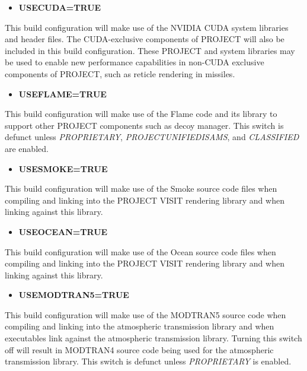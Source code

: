 \documentclass[12pt,letterpaper]{article}
\begin{document}
\begin{itemize}
\item \textbf{USECUDA=TRUE}
\end{itemize}

This build configuration will make use of the NVIDIA CUDA system libraries and header files.  The CUDA-exclusive components of PROJECT will also be included in this build configuration.  These PROJECT and system libraries may be used to enable new performance capabilities in non-CUDA exclusive components of PROJECT, such as reticle rendering in missiles.

\begin{itemize}
\item \textbf{USEFLAME=TRUE}
\end{itemize}

This build configuration will make use of the Flame code and its library to support other PROJECT components such as decoy manager.  This switch is defunct unless \emph{PROPRIETARY}, \emph{PROJECTUNIFIEDISAMS}, and \emph{CLASSIFIED} are enabled.

\begin{itemize}
\item \textbf{USESMOKE=TRUE}
\end{itemize}

This build configuration will make use of the Smoke source code files when compiling and linking into the PROJECT VISIT rendering library and when linking against this library.

\begin{itemize}
\item \textbf{USEOCEAN=TRUE}
\end{itemize}

This build configuration will make use of the Ocean source code files when compiling and linking into the PROJECT VISIT rendering library and when linking against this library.

\begin{itemize}
\item \textbf{USEMODTRAN5=TRUE}
\end{itemize}

This build configuration will make use of the MODTRAN5 source code when compiling and linking into the atmospheric transmission library and when executables link against the atmospheric transmission library.  Turning this switch off will result in MODTRAN4 source code being used for the atmospheric transmission library.  This switch is defunct unless \emph{PROPRIETARY} is enabled.
\end{document}
